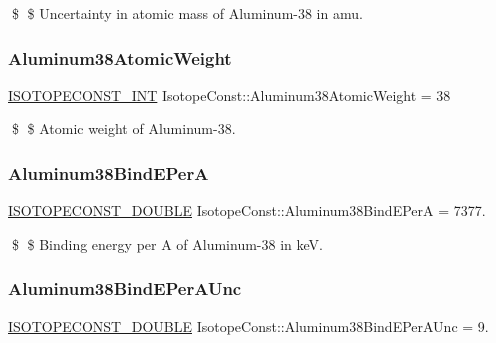 \$ \$ Uncertainty in atomic mass of Aluminum-\/38 in amu. \mbox{\label{group___isotope_const-_aluminum-_al38_gabd969290d8cfe3214ddb1680902fe2fb}} 
\subsubsection{\texorpdfstring{Aluminum38\+Atomic\+Weight}{Aluminum38AtomicWeight}}
{\footnotesize\ttfamily \mbox{\hyperlink{group___isotope_const-_macros_ga5f18360b3e99483a35c32d789e62621c}{I\+S\+O\+T\+O\+P\+E\+C\+O\+N\+S\+T\+\_\+\+I\+NT}} Isotope\+Const\+::\+Aluminum38\+Atomic\+Weight = 38}

\$ \$ Atomic weight of Aluminum-\/38. \mbox{\label{group___isotope_const-_aluminum-_al38_ga38c4b29fa307384b44b71257bcb7c581}} 
\subsubsection{\texorpdfstring{Aluminum38\+Bind\+E\+PerA}{Aluminum38BindEPerA}}
{\footnotesize\ttfamily \mbox{\hyperlink{group___isotope_const-_macros_ga8f45a7272ce02c0b4c65c44636ed719a}{I\+S\+O\+T\+O\+P\+E\+C\+O\+N\+S\+T\+\_\+\+D\+O\+U\+B\+LE}} Isotope\+Const\+::\+Aluminum38\+Bind\+E\+PerA = 7377.}

\$ \$ Binding energy per A of Aluminum-\/38 in keV. \mbox{\label{group___isotope_const-_aluminum-_al38_gadd1aaa3229f63a45d4533a960fc17a90}} 
\subsubsection{\texorpdfstring{Aluminum38\+Bind\+E\+Per\+A\+Unc}{Aluminum38BindEPerAUnc}}
{\footnotesize\ttfamily \mbox{\hyperlink{group___isotope_const-_macros_ga8f45a7272ce02c0b4c65c44636ed719a}{I\+S\+O\+T\+O\+P\+E\+C\+O\+N\+S\+T\+\_\+\+D\+O\+U\+B\+LE}} Isotope\+Const\+::\+Aluminum38\+Bind\+E\+Per\+A\+Unc = 9.}

